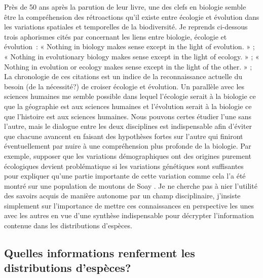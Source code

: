 Près de 50 ans après la parution de leur livre, une des clefs en
biologie semble être la compréhension des rétroactions qu'il existe
entre écologie et évolution dans les variations spatiales et temporelles
de la biodiversité. Je reprends ci-dessous trois aphorismes cités par
\citet{Schoener2011a} concernant les liens entre biologie, écologie et
évolution~: « Nothing in biology makes sense except in the light of
evolution. » \citep{Dobzhansky1973}; « Nothing in evolutionary biology
makes sense except in the light of ecology. » \citep{grant2008}; «
Nothing in evolution or ecology makes sense except in the light of the
other. » \citep{Pelletier2009a}; La chronologie de ces citations est un
indice de la reconnaissance actuelle du besoin (de la nécessité?) de
croiser écologie et évolution. Un parallèle avec les sciences humaines
me semble possible dans lequel l'écologie serait à la biologie ce que la
géographie est aux sciences humaines et l'évolution serait à la biologie
ce que l'histoire est aux sciences humaines. Nous pouvons certes étudier
l'une sans l'autre, mais le dialogue entre les deux disciplines est
indispensable afin d'éviter que chacune avancent en faisant des
hypothèses fortes sur l'autre qui finiront éventuellement par nuire à
une compréhension plus profonde de la biologie. Par exemple, supposer
que les variations démographiques ont des origines purement écologiques
devient problématique si les variations génétiques sont suffisantes pour
expliquer qu'une partie importante de cette variation comme cela l'a été
montré sur une population de moutons de Soay \citep{Pelletier2007}. Je
ne cherche pas à nier l'utilité des savoirs acquis de manière autonome
par un champ disciplinaire, j'insiste simplement sur l'importance de
mettre ces connaissances en perspective les unes avec les autres en vue
d'une synthèse indispensable pour décrypter l'information contenue dans
les distributions d'espèces.

\subsection*{Quelles informations renferment les distributions
d'espèces?}\label{quelles-informations-renferment-les-distributions-despuxe8ces}


